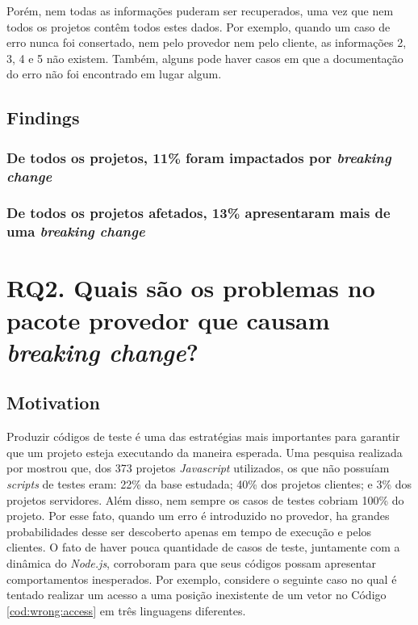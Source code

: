 Porém, nem todas as informações puderam ser recuperados, uma vez que nem todos os projetos contêm todos estes dados. Por exemplo, quando um caso de erro nunca foi consertado, nem pelo provedor nem pelo cliente, as informações 2, 3, 4 e 5 não existem. Também, alguns pode haver casos em que a documentação do erro não foi encontrado em lugar algum.

\subsection{Findings}
\label{fin:rq1}

\subsubsection{De todos os projetos, 11\% foram impactados por \textit{breaking change}}

\subsubsection{De todos os projetos afetados, 13\% apresentaram mais de uma \textit{breaking change}}

\section{RQ2. Quais são os problemas no pacote provedor que causam \textit{breaking change}?}
\label{sec:rq2}

\subsection{Motivation}
\label{mot:rq2}

Produzir códigos de teste é uma das estratégias mais importantes para garantir que um projeto esteja executando da maneira esperada. Uma pesquisa realizada por  mostrou que, dos 373 projetos \textit{Javascript} utilizados, os que não possuíam \textit{scripts} de testes eram: 22\% da base estudada; 40\% dos projetos clientes; e 3\% dos projetos servidores. Além disso, nem sempre os casos de testes cobriam 100\% do projeto. Por esse fato, quando um erro é introduzido no provedor, ha grandes probabilidades desse ser descoberto apenas em tempo de execução e pelos clientes. O fato de haver pouca quantidade de casos de teste, juntamente com a dinâmica do \textit{Node.js}, corroboram para que seus códigos possam apresentar comportamentos inesperados. Por exemplo, considere o seguinte caso no qual é tentado realizar um acesso a uma posição inexistente de um vetor no Código \ref{cod:wrong:access} em três linguagens diferentes.

